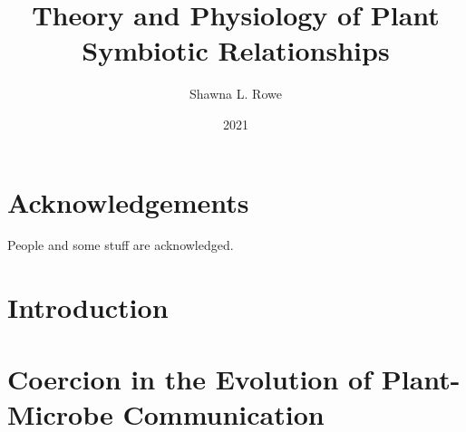 \documentclass[PhD]{msu-thesis}
\title{Theory and Physiology of Plant Symbiotic Relationships}
\author{Shawna L. Rowe}
\date{2021}
\begin{document}
\frontmatter
\maketitlepage


\begin{abstract}
\end{abstract}

\clearpage

\makecopyrightpage

%
%
\clearpage
\chapter*{Acknowledgements}
\DoubleSpacing %
People and some stuff are acknowledged.
%
\clearpage
\SingleSpacing
\tableofcontents* %
\clearpage
\listoftables %
\clearpage
\listoffigures %
%
%
\mainmatter
%

\chapter*{Introduction}
\clearpage

\chapter{Coercion in the Evolution of Plant-Microbe Communication}
%
%
%
\end{document}
